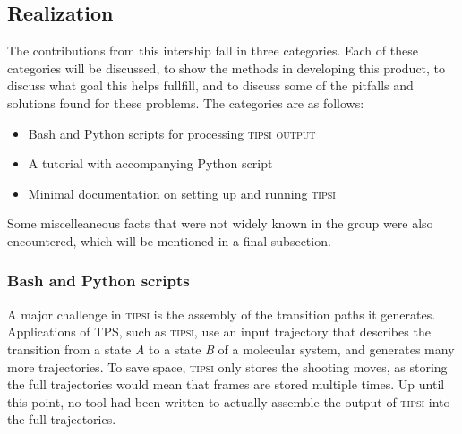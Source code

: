 \documentclass[]{article}
\begin{document}
\subsection*{Realization}

The contributions from this intership fall in three categories. Each of these categories will be discussed, to show the methods in developing this product, to discuss what goal this helps fullfill, and to discuss some of the pitfalls and solutions found for these problems. The categories are as follows:
%
\begin{itemize}
\item Bash and Python scripts for processing \textsc{tipsi output}
\item A tutorial with accompanying Python script
\item Minimal documentation on setting up and running \textsc{tipsi}
\end{itemize}
%
Some miscelleaneous facts that were not widely known in the group were also encountered, which will be mentioned in a final subsection.

\subsubsection*{Bash and Python scripts}

A major challenge in \textsc{tipsi} is the assembly of the transition paths it generates. Applications of TPS, such as \textsc{tipsi}, use an input trajectory that describes the transition from a state \textit{A} to a state \textit{B} of a molecular system, and generates many more trajectories. 
To save space, \textsc{tipsi} only stores the shooting moves, as storing the full trajectories would mean that frames are stored multiple times. Up until this point, no tool had been written to actually assemble the output of \textsc{tipsi} into the full trajectories.
\end{document}
